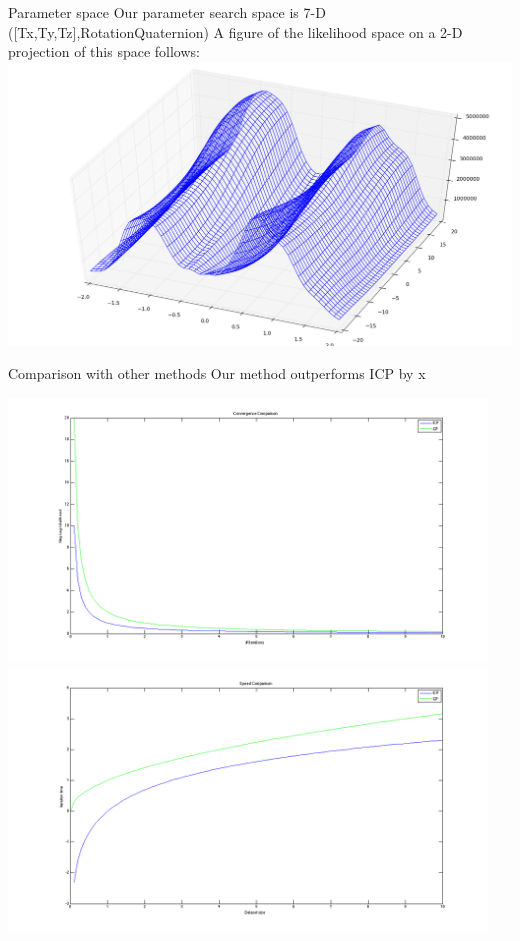 \documentclass[final]{beamer}
\begin{document}
\begin{frame}{}
\begin{textblock}{27}
\begin{block}{Parameter space}
Our parameter search space is 7-D ([Tx,Ty,Tz],RotationQuaternion)
A figure of the likelihood space on a 2-D projection of this space follows:
\includegraphics[width=10in]{LLProjection.png}
\end{block}

\begin{block}{Comparison with other methods}
Our method outperforms ICP by x%

\includegraphics[width=5in]{ConvergenceComparison.png}
\includegraphics[width=5in]{SpeedComparison.png}
\end{block}


\end{textblock}
\end{frame}
\end{document}
